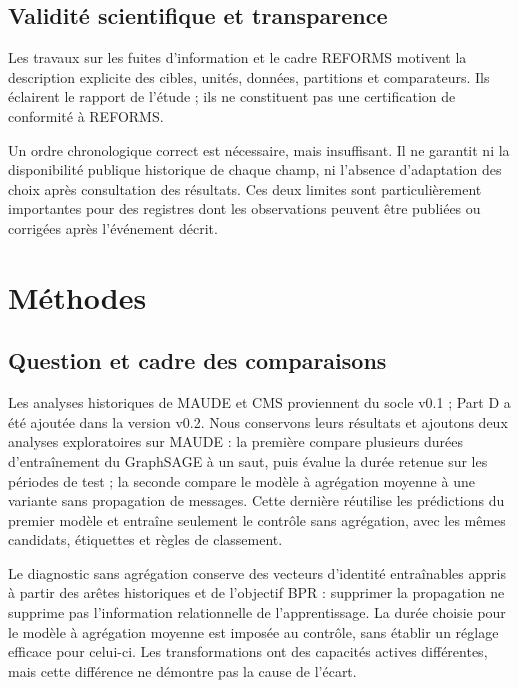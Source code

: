 \subsection{Validité scientifique et transparence}

Les travaux sur les fuites d'information et le cadre REFORMS motivent la description explicite des cibles, unités, données, partitions et comparateurs\cite{kapoor2023leakage,kapoor2024reforms}. Ils éclairent le rapport de l'étude ; ils ne constituent pas une certification de conformité à REFORMS.

Un ordre chronologique correct est nécessaire, mais insuffisant. Il ne garantit ni la disponibilité publique historique de chaque champ, ni l'absence d'adaptation des choix après consultation des résultats. Ces deux limites sont particulièrement importantes pour des registres dont les observations peuvent être publiées ou corrigées après l'événement décrit.


\section{Méthodes}
\label{sec:methods}

\subsection{Question et cadre des comparaisons}

Les analyses historiques de MAUDE et CMS proviennent du socle v0.1 ; Part D a été ajoutée dans la version v0.2. Nous conservons leurs résultats et ajoutons deux analyses exploratoires sur MAUDE : la première compare plusieurs durées d'entraînement du GraphSAGE à un saut, puis évalue la durée retenue sur les périodes de test ; la seconde compare le modèle à agrégation moyenne à une variante sans propagation de messages. Cette dernière réutilise les prédictions du premier modèle et entraîne seulement le contrôle sans agrégation, avec les mêmes candidats, étiquettes et règles de classement.

Le diagnostic sans agrégation conserve des vecteurs d'identité entraînables appris à partir des arêtes historiques et de l'objectif BPR : supprimer la propagation ne supprime pas l'information relationnelle de l'apprentissage. La durée choisie pour le modèle à agrégation moyenne est imposée au contrôle, sans établir un réglage efficace pour celui-ci. Les transformations ont des capacités actives différentes, mais cette différence ne démontre pas la cause de l'écart.

